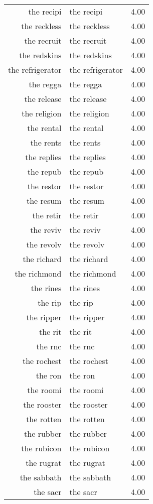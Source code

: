 \begin{table}[ht]
\begin{tabular}{rlr}
  the recipi & the recipi & 4.00 \\ 
  the reckless & the reckless & 4.00 \\ 
  the recruit & the recruit & 4.00 \\ 
  the redskins & the redskins & 4.00 \\ 
  the refrigerator & the refrigerator & 4.00 \\ 
  the regga & the regga & 4.00 \\ 
  the release & the release & 4.00 \\ 
  the religion & the religion & 4.00 \\ 
  the rental & the rental & 4.00 \\ 
  the rents & the rents & 4.00 \\ 
  the replies & the replies & 4.00 \\ 
  the repub & the repub & 4.00 \\ 
  the restor & the restor & 4.00 \\ 
  the resum & the resum & 4.00 \\ 
  the retir & the retir & 4.00 \\ 
  the reviv & the reviv & 4.00 \\ 
  the revolv & the revolv & 4.00 \\ 
  the richard & the richard & 4.00 \\ 
  the richmond & the richmond & 4.00 \\ 
  the rines & the rines & 4.00 \\ 
  the rip & the rip & 4.00 \\ 
  the ripper & the ripper & 4.00 \\ 
  the rit & the rit & 4.00 \\ 
  the rnc & the rnc & 4.00 \\ 
  the rochest & the rochest & 4.00 \\ 
  the ron & the ron & 4.00 \\ 
  the roomi & the roomi & 4.00 \\ 
  the rooster & the rooster & 4.00 \\ 
  the rotten & the rotten & 4.00 \\ 
  the rubber & the rubber & 4.00 \\ 
  the rubicon & the rubicon & 4.00 \\ 
  the rugrat & the rugrat & 4.00 \\ 
  the sabbath & the sabbath & 4.00 \\ 
  the sacr & the sacr & 4.00 \\ 

\end{tabular}
\end{table}

